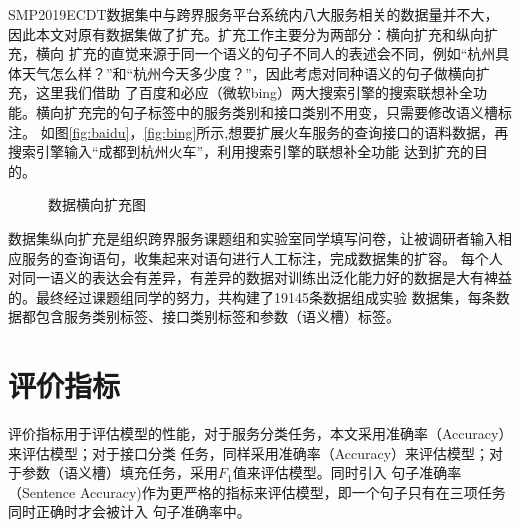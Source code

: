 SMP2019ECDT数据集中与跨界服务平台系统内八大服务相关的数据量并不大，因此本文对原有数据集做了扩充。扩充工作主要分为两部分：横向扩充和纵向扩充，横向
扩充的直觉来源于同一个语义的句子不同人的表述会不同，例如“杭州具体天气怎么样？”和“杭州今天多少度？”，因此考虑对同种语义的句子做横向扩充，这里我们借助
了百度和必应（微软bing）两大搜索引擎的搜索联想补全功能。横向扩充完的句子标签中的服务类别和接口类别不用变，只需要修改语义槽标注。
如图\ref{fig:baidu}，\ref{fig:bing}所示,想要扩展火车服务的查询接口的语料数据，再搜索引擎输入“成都到杭州火车”，利用搜索引擎的联想补全功能
达到扩充的目的。


  \begin{figure}[htbp]
    \caption{数据横向扩充图}
    \label{fig:fuwuguanli}
    \end{figure}

数据集纵向扩充是组织跨界服务课题组和实验室同学填写问卷，让被调研者输入相应服务的查询语句，收集起来对语句进行人工标注，完成数据集的扩容。
每个人对同一语义的表达会有差异，有差异的数据对训练出泛化能力好的数据是大有裨益的。最终经过课题组同学的努力，共构建了19145条数据组成实验
数据集，每条数据都包含服务类别标签、接口类别标签和参数（语义槽）标签。


\section{评价指标}
评价指标用于评估模型的性能，对于服务分类任务，本文采用准确率（Accuracy）来评估模型；对于接口分类
任务，同样采用准确率（Accuracy）来评估模型；对于参数（语义槽）填充任务，采用$F_1$值来评估模型。同时引入
句子准确率（Sentence Accuracy)作为更严格的指标来评估模型，即一个句子只有在三项任务同时正确时才会被计入
句子准确率中。

